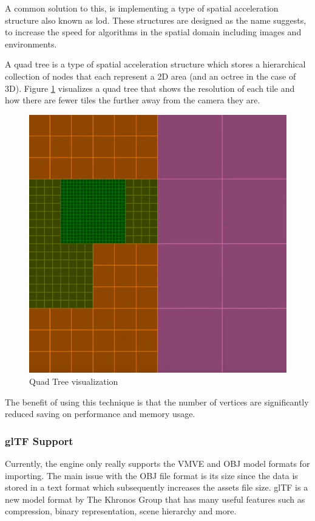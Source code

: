 \documentclass[11pt]{article}
\begin{document}
A common solution to this, is implementing a type of spatial acceleration
structure also known as \gls{lod}. These structures are designed as the name
suggests, to increase the speed for algorithms in the spatial domain including
images and environments.

A quad tree is a type of spatial acceleration structure which stores a
hierarchical collection of nodes that each represent a 2D area (and an octree in
the case of 3D). Figure \ref{fig:quad_tree} visualizes a quad tree that shows
the resolution of each tile and how there are fewer tiles the further away from
the camera they are.

\begin{figure}[h!]
  \centering
  \includegraphics[width=\textwidth]{images/quad_tree.png}
  \caption{Quad Tree visualization}
  \label{fig:quad_tree}
\end{figure}

The benefit of using this technique is that the number of vertices are
significantly reduced saving on performance and memory usage.


\subsubsection{glTF Support}
Currently, the engine only really supports the VMVE and OBJ model formats for
importing. The main issue with the OBJ file format is its size since the data is
stored in a text format which subsequently increases the assets file size. glTF
\cite{gltf} is a new model format by The Khronos Group that has many useful
features such as compression, binary representation, scene hierarchy and more.
\end{document}
